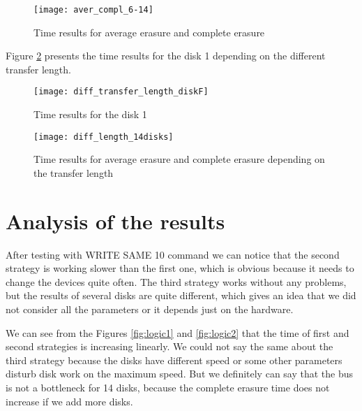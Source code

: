 \begin{figure}[h!]
\begin{center}
  \texttt{[image: aver\_compl\_6-14]}
\end{center}
  \caption{Time results for average erasure and complete erasure}
  \label{fig:aver_compl_6-14}
\end{figure}

\newpage
Figure \ref{fig:diff_transfer_length_diskF} presents the time results for the disk 1 depending on the different transfer length.

\begin{figure}[h!]
\begin{center}
  \texttt{[image: diff\_transfer\_length\_diskF]}
\end{center}
  \caption{Time results for the disk 1}
  \label{fig:diff_transfer_length_diskF}
\end{figure}


\begin{figure}[h!]
\begin{center}
  \texttt{[image: diff\_length\_14disks]}
\end{center}
  \caption{Time results for average erasure and complete erasure depending on the transfer length}
  \label{fig:diff_length_14disks}
\end{figure}

\newpage
\section{Analysis of the results}

After testing with WRITE SAME 10 command we can notice that the second strategy is working slower than the first one, which is obvious because it needs to change the devices quite often. The third strategy works without any problems, but the results of several disks are quite different, which gives an idea that we did not consider all the parameters or it depends just on the hardware.

We can see from the Figures \ref{fig:logic1} and \ref{fig:logic2} that the time of first and second strategies is increasing linearly. We could not say the same about the third strategy because the disks have different speed or some other parameters disturb disk work on the maximum speed. But we definitely can say that the bus is not a bottleneck for 14 disks, because the complete erasure time does not increase if we add more disks.

